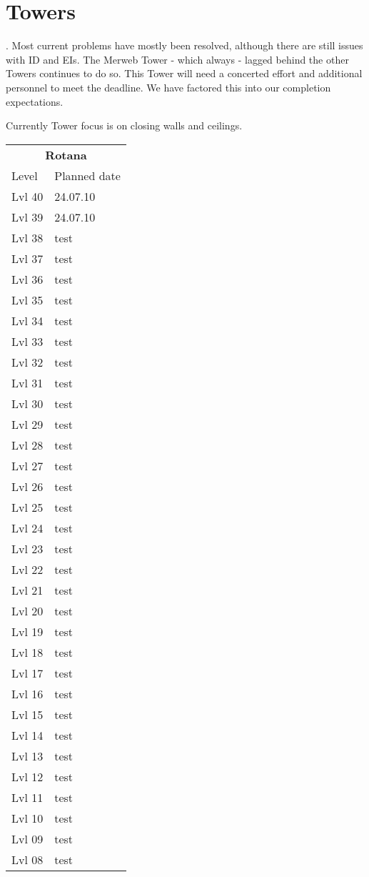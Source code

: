\chapter{Towers}\label{sec:towers1}

. Most current problems have mostly been resolved, although there are still issues with ID and EIs.  The Merweb Tower - which always - lagged behind the other Towers continues to do so. This Tower will need a concerted effort and additional personnel to meet the deadline. We have factored this into our completion expectations.

Currently Tower focus is on closing walls and ceilings. 



\newpage
\small
\begin{tabular}{ll}
\toprule 
\multicolumn{2}{c}{\bf Rotana}\\
Level & Planned date\\
\midrule

Lvl 40  & 24.07.10\\
Lvl 39  & 24.07.10\\
Lvl 38  & test\\
Lvl 37  & test\\
Lvl 36  & test\\
Lvl 35  & test\\
Lvl 34  & test\\
Lvl 33  & test\\
Lvl 32  & test\\
Lvl 31  & test\\
Lvl 30  & test\\
Lvl 29  & test\\
Lvl 28  & test\\
Lvl 27  & test\\
Lvl 26  & test\\
Lvl 25  & test\\
Lvl 24  & test\\
Lvl 23  & test\\
Lvl 22  & test\\
Lvl 21  & test\\
Lvl 20  & test\\
Lvl 19  & test\\
Lvl 18  & test\\
Lvl 17  & test\\
Lvl 16  & test\\
Lvl 15  & test\\
Lvl 14  & test\\
Lvl 13  & test\\
Lvl 12  & test\\
Lvl 11  & test\\
Lvl 10  & test\\
Lvl 09  & test\\
Lvl 08  & test\\
\bottomrule
\end{tabular}
\normalsize



